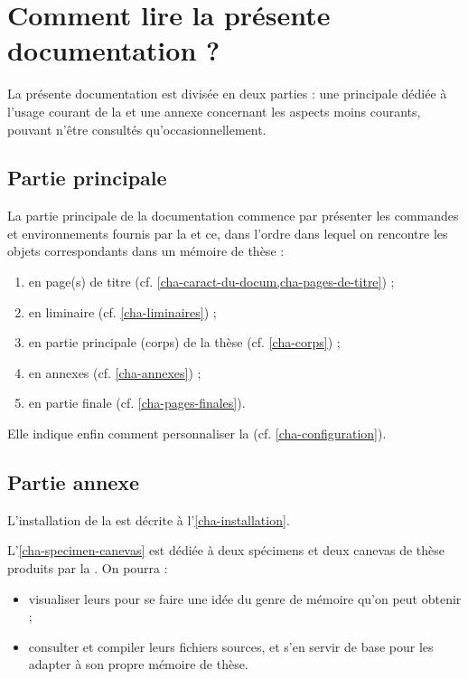\section{Comment lire la présente documentation ?}
\label{sec-comment-lire-cette}

La présente documentation est divisée en deux parties : une principale dédiée
à l'usage courant de la \yatCl{} et une annexe concernant les aspects moins
courants, pouvant n'être consultés qu'occasionnellement.

\subsection{Partie principale}
\label{sec-partie-principale}

La partie principale de la documentation commence par présenter les commandes et
environnements fournis par la \yatCl{} et ce, dans l'ordre dans lequel on
rencontre les objets correspondants dans un mémoire de thèse :
\begin{enumerate}
\item en page(s) de titre (cf. \vref{cha-caract-du-docum,cha-pages-de-titre}) ;
\item en \gls{liminaire} (cf. \vref{cha-liminaires}) ;
\item en partie principale (corps) de la thèse (cf. \vref{cha-corps}) ;
\item en annexes (cf. \vref{cha-annexes}) ;
\item en partie finale (cf. \vref{cha-pages-finales}).
\end{enumerate}
Elle indique enfin comment personnaliser la \yatCl{}
(cf. \vref{cha-configuration}).

\subsection{Partie annexe}
\label{sec-partie-annexe}

L'installation de la \yatCl{} est décrite à l'\vref{cha-installation}.

L'\vref{cha-specimen-canevas} est dédiée à deux spécimens et deux canevas de
thèse produits par la \yatCl{}. On pourra :
\begin{itemize}
\item visualiser leurs  pour se faire une idée du genre de
  mémoire qu'on peut obtenir ;
\item consulter et compiler leurs fichiers sources, et s'en servir de base pour
  les adapter à son propre mémoire de thèse.
\end{itemize}

